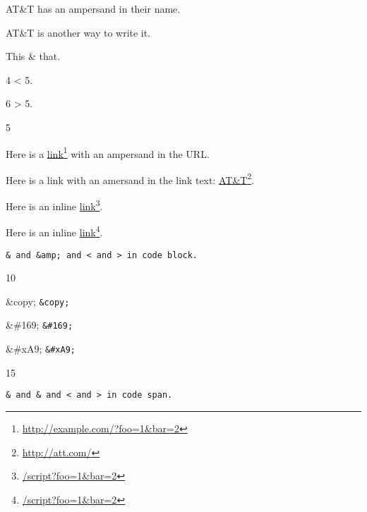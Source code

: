 
\def\mytitle{Amps and Angles}


AT\&T has an ampersand in their name.

AT\&T is another way to write it.

This \& that.

4 < 5.

6 > 5.

5

Here is a \href{http://example.com/?foo=1&bar=2}{link}\footnote{\href{http://example.com/?foo=1&bar=2}{http:\slash \slash example.com\slash ?foo=1\&bar=2}} with an ampersand in the URL.

Here is a link with an amersand in the link text: \href{http://att.com/}{AT\&T}\footnote{\href{http://att.com/}{http:\slash \slash att.com\slash }}.

Here is an inline \href{/script?foo=1&bar=2}{link}\footnote{\href{/script?foo=1&bar=2}{\slash script?foo=1\&bar=2}}.

Here is an inline \href{/script?foo=1&bar=2}{link}\footnote{\href{/script?foo=1&bar=2}{\slash script?foo=1\&bar=2}}.

\begin{verbatim}
& and &amp; and < and > in code block.
\end{verbatim}

10

\&copy; \texttt{\&copy;}

\&\#169; \texttt{\&\#169;}

\&\#xA9; \texttt{\&\#xA9;}

15

\texttt{\& and \& and < and > in code span.}



